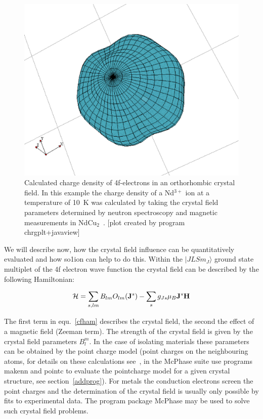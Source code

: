 \begin{figure}[ht]
\includegraphics[angle=0,width=0.7\columnwidth]{./figsrc/chrgpla.eps}
\caption{\label{chrgplb}
Calculated charge density of 4f-electrons in an orthorhombic crystal field. In
this example the charge density of a Nd$^{3+}$ ion at a temperature of 10~K was 
calculated by taking the crystal
field parameters determined by neutron spectroscopy and 
magnetic measurements in NdCu$_2$~\cite{gratz91-9297}.
[plot created by program {\prg chrgplt+javaview}]}
\end{figure}

We will describe now, how the crystal field influence can be quantitatively evaluated
and how {\prg so1ion}  can help to do this.
Within the $|JLSm_J \rangle$ ground state multiplet of the 4f electron wave function 
the crystal field can be described by the following Hamiltonian:

\begin{equation}
\label{cfham}
 {\mathcal H}= \sum_{s,lm} B_{lm} O_{lm}({\mathbf J}^s) 
	     - \sum_{s} g_{Js} \mu_B {\mathbf J}^s {\mathbf H} 
\end{equation}

The first term in equ.~\ref{cfham} describes the crystal field, the second the
effect of a magnetic field (Zeeman term). The strength of the crystal field is given by the
crystal field parameters $B_l^m$. In the case of isolating materials these
parameters can be obtained by the point charge model (point charges on the 
neighbouring atoms, for details on these calculations see~\cite{hutchings64-227},
in the {\prg McPhase} suite use programs {\prg makenn} and {\prg pointc} to evaluate
the pointcharge model for a given crystal structure, see section~\ref{addprog}).
For metals the conduction electrons screen the point charges and the determination
of the crystal field is usually only possible by fits to experimental data. 
The program package {\prg McPhase} may be used to solve such crystal field problems.


